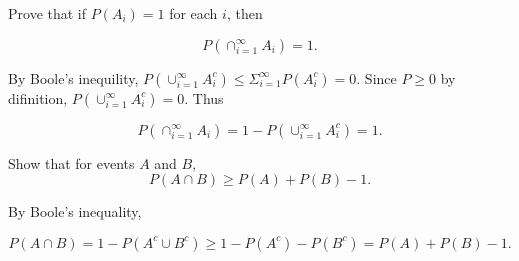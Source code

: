 \begin{exercise}
  Prove that if $P(A_i)=1$ for each $i$, then

  \[ P(\cap_{i=1}^\infty A_i) = 1 . \]
\end{exercise}
\begin{solution}
  By Boole's inequility, $ P(\cup_{i=1}^\infty A_i^c) \leq \Sigma_{i=1}^\infty P(A_i^c) = 0 $. Since $P\geq 0$ by difinition, $P(\cup_{i=1}^\infty A_i^c) = 0$. Thus

  \[ P(\cap_{i=1}^\infty A_i) = 1 - P(\cup_{i=1}^\infty A_i^c) = 1 .\]
\end{solution}

\begin{exercise}
  Show that for events $A$ and $B$,
  \[ P(A\cap B) \geq P(A) + P(B) - 1. \]
\end{exercise}
\begin{solution}
  By Boole's inequality,

  \[ P(A\cap B) = 1 - P(A^c\cup B^c) \geq 1 - P(A^c) - P(B^c) = P(A) + P(B) - 1 . \]
\end{solution}
